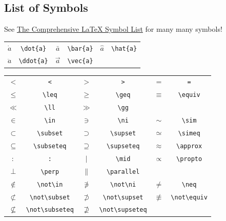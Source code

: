 \documentclass{article}
\begin{document}
    \subsection{List of Symbols}
    See \href{https://www.ctan.org/tex-archive/info/symbols/comprehensive}{The Comprehensive \LaTeX{} Symbol List} for many many symbols!
    \begin{table}[!htbp]
        \centering
        \begin{tabular}{cccccc}
            $\dot{a}$ & \verb|\dot{a}| &
            $\bar{a}$ & \verb|\bar{a}| &
            $\hat{a}$ & \verb|\hat{a}| \\
            $\ddot{a}$ & \verb|\ddot{a}| &
            $\vec{a}$ & \verb|\vec{a}| \\
        \end{tabular}
    \end{table}
    \begin{table}[!htbp]
        \centering
        \begin{tabular}{cccccc}
            $<$ & \verb|<| &
            $>$ & \verb|>| &
            $=$ & \verb|=| \\
            $\leq$ & \verb|\leq| &
            $\geq$ & \verb|\geq| &
            $\equiv$ & \verb|\equiv| \\
            $\ll$ & \verb|\ll| &
            $\gg$ & \verb|\gg| \\
            $\in$ & \verb|\in| &
            $\ni$ & \verb|\ni| &
            $\sim$ & \verb|\sim| \\
            $\subset$ & \verb|\subset| &
            $\supset$ & \verb|\supset| &
            $\simeq$ & \verb|\simeq| \\
            $\subseteq$ & \verb|\subseteq| &
            $\supseteq$ & \verb|\supseteq| &
            $\approx$ & \verb|\approx| \\
            $:$ & \verb|:| &
            $\mid$ & \verb|\mid| &
            $\propto$ & \verb|\propto| \\
            $\perp$ & \verb|\perp| &
            $\parallel$ & \verb|\parallel| \\
            $\not\in$ & \verb|\not\in| &
            $\not\ni$ & \verb|\not\ni| &
            $\neq$ & \verb|\neq| \\
            $\not\subset$ & \verb|\not\subset| &
            $\not\supset$ & \verb|\not\supset| &
            $\not\equiv$ & \verb|\not\equiv| \\
            $\not\subseteq$ & \verb|\not\subseteq| &
            $\not\supseteq$ & \verb|\not\supseteq| \\
        \end{tabular}
    \end{table}
\end{document}
